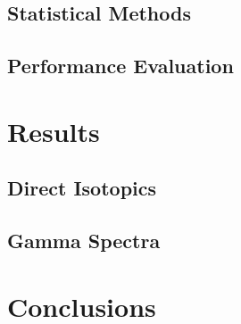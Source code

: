 \documentclass[10pt]{beamer}
\begin{document}
\subsection{Statistical Methods}

\subsection{Performance Evaluation}


\section{Results}
\subsection{Direct Isotopics}

\subsection{Gamma Spectra}


\section{Conclusions}


\end{document}
